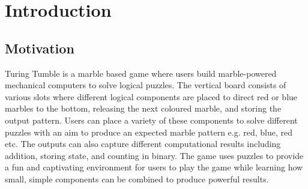 \documentclass{l4proj}
\begin{document}
%
%
%
%
%
%
%
%
\chapter{Introduction}


\section{Motivation}
Turing Tumble is a marble based game where users build marble-powered mechanical computers to solve logical puzzles. The vertical board consists of various slots where different logical components are placed to direct red or blue marbles to the bottom, releasing the next coloured marble, and storing the output pattern. Users can place a variety of these components to solve different puzzles with an aim to produce an expected marble pattern e.g. red, blue, red etc. The outputs can also capture different computational results including addition, storing state, and counting in binary. The game uses puzzles to provide a fun and captivating environment for users to play the game while learning how small, simple components can be combined to produce powerful results. 
\end{document}
